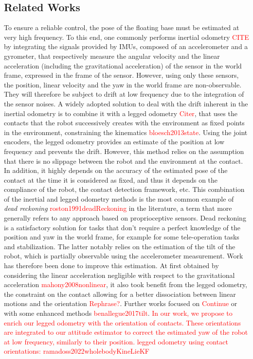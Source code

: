 \documentclass{IJCAS}
\begin{document}
\subsection{Related Works}
    To ensure a reliable control, the pose of the floating base must be estimated at very high frequency. To this end, one commonly performs inertial odometry \textcolor{red}{CITE} by integrating the signals provided by IMUs, composed of an accelerometer and a gyrometer, that respectively measure the angular velocity and the linear acceleration (including the gravitational acceleration) of the sensor in the world frame, expressed in the frame of the sensor. However, using only these sensors, the position, linear velocity and the yaw in the world frame are non-observable. They will therefore be subject to drift at low frequency due to the integration of the sensor noises. 
    A widely adopted solution to deal with the drift inherent in the inertial odometry is to combine it with a legged odometry \textcolor{red}{Citer}, that uses the contacts that the robot successively creates with the environment as fixed points in the environment, constraining the kinematics \textcolor{red}{bloesch2013state}. Using the joint encoders, the legged odometry provides an estimate of the position at low frequency and prevents the drift. However, this method relies on the assumption that there is no slippage between the robot and the environment at the contact. In addition, it highly depends on the accuracy of the estimated pose of the contact at the time it is considered as fixed, and thus it depends on the compliance of the robot, the contact detection framework, etc. This combination of the inertial and legged odometry methods is the most common example of \emph{dead reckoning} \textcolor{red}{roston1991deadReckoning} in the literature, a term that more generally refers to any approach based on proprioceptive sensors. Dead reckoning is a satisfactory solution for tasks that don't require a perfect knowledge of the position and yaw in the world frame, for example for some tele-operation tasks and stabilization. The latter notably relies on the estimation of the tilt of the robot, which is partially observable using the accelerometer measurement. Work has therefore been done to improve this estimation. At first obtained by considering the linear acceleration negligible with respect to the gravitational acceleration \textcolor{red}{mahony2008nonlinear}, it also took benefit from the legged odometry, the constraint on the contact allowing for a better dissociation between linear motions and the orientation \textcolor{red}{Rephrase?}. Further works focused on \textcolor{red}{Continue} or with some enhanced methods \textcolor{red}{benallegue2017tilt}. \textcolor{red}{In our work, we propose to enrich our legged odometry with the orientation of contacts. These orientations are integrated to our attitude estimator to correct the estimated yaw of the robot at low frequency, similarly to their position.}
    \textcolor{red}{legged odometry using contact orientations: ramadoss2022wholebodyKineLieKF}
    
\end{document}
